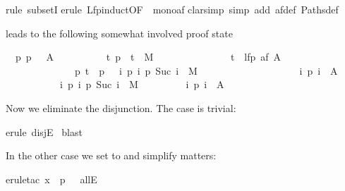 \begin{isabellebody}
rule\ subsetI{\isacharparenright}\isanewline
{}erule\ Lfp{\isachardot}induct{\isacharbrackleft}OF\ {\isacharunderscore}\ mono{\isacharunderscore}af{\isacharbrackright}{\isacharparenright}\isanewline
{}clarsimp\ simp\ add{\isacharcolon}\ af{\isacharunderscore}def\ Paths{\isacharunderscore}def{\isacharparenright}%
\begin{isamarkuptxt}%
\noindent
leads to the following somewhat involved proof state
\begin{isabelle}
\ \ {\isasymAnd}p{\isachardot}\ {\isasymlbrakk}p\ \ {\isasymin}\ A\ {\isasymor}\isanewline
\ \ \ \ \ \ \ \ \ {\isacharparenleft}{\isasymforall}t{\isachardot}\ {\isacharparenleft}p\ \ t{\isacharparenright}\ {\isasymin}\ M\ {\isasymlongrightarrow}\isanewline
\ \ \ \ \ \ \ \ \ \ \ \ \ \ t\ {\isasymin}\ lfp\ {\isacharparenleft}af\ A{\isacharparenright}\ {\isasymand}\isanewline
\ \ \ \ \ \ \ \ \ \ \ \ \ \ {\isacharparenleft}{\isasymforall}p{\isachardot}\ t\ {\isacharequal}\ p\ \ {\isasymand}\ {\isacharparenleft}{\isasymforall}i{\isachardot}\ {\isacharparenleft}p\ i{\isacharcomma}\ p\ {\isacharparenleft}Suc\ i{\isacharparenright}{\isacharparenright}\ {\isasymin}\ M{\isacharparenright}\ {\isasymlongrightarrow}\isanewline
\ \ \ \ \ \ \ \ \ \ \ \ \ \ \ \ \ \ \ {\isacharparenleft}{\isasymexists}i{\isachardot}\ p\ i\ {\isasymin}\ A{\isacharparenright}{\isacharparenright}{\isacharparenright}{\isacharsemicolon}\isanewline
\ \ \ \ \ \ \ \ \ \ \ {\isasymforall}i{\isachardot}\ {\isacharparenleft}p\ i{\isacharcomma}\ p\ {\isacharparenleft}Suc\ i{\isacharparenright}{\isacharparenright}\ {\isasymin}\ M{\isasymrbrakk}\isanewline
\ \ \ \ \ \ \ \ {\isasymLongrightarrow}\ {\isasymexists}i{\isachardot}\ p\ i\ {\isasymin}\ A
\end{isabelle}
Now we eliminate the disjunction. The case  is trivial:%
\end{isamarkuptxt}%
erule\ disjE{\isacharparenright}\isanewline
\ blast{\isacharparenright}%
\begin{isamarkuptxt}%
\noindent
In the other case we set  to  and simplify matters:%
\end{isamarkuptxt}%
erule{\isacharunderscore}tac\ x\ {\isacharequal}\ {\isachardoublequote}p\ \ \ allE{\isacharparenright}\isanewline

\end{isabellebody}
